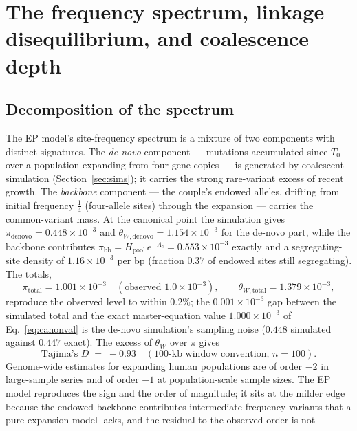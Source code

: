 \section{The frequency spectrum, linkage disequilibrium, and coalescence depth}\label{sec:sfsld}

\subsection{Decomposition of the spectrum}
The EP model's site-frequency spectrum is a mixture of two components with
distinct signatures. The \emph{de-novo} component --- mutations accumulated
since $T_0$ over a population expanding from four gene copies --- is
generated by coalescent simulation (Section~\ref{sec:sims}); it carries the
strong rare-variant excess of recent growth. The \emph{backbone} component
--- the couple's endowed alleles, drifting from initial frequency
$\tfrac14$ (four-allele sites) through the expansion --- carries the
common-variant mass. At the canonical point the simulation gives
$\pi_{\mathrm{denovo}} = 0.448\times10^{-3}$ and
$\theta_{W,\mathrm{denovo}} = 1.154\times10^{-3}$ for the de-novo part,
while the backbone contributes
$\pi_{\mathrm{bb}} = H_{\mathrm{pool}}\,e^{-\Lambda_c} =
0.553\times10^{-3}$ exactly and a segregating-site density of
$1.16\times10^{-3}$ per bp (fraction $0.37$ of endowed sites still
segregating). The totals,
\begin{equation}\label{eq:sfstot}
\pi_{\mathrm{total}} = 1.001\times10^{-3}
\quad (\text{observed } 1.0\times10^{-3}), \qquad
\theta_{W,\mathrm{total}} = 1.379\times10^{-3},
\end{equation}
reproduce the observed level to within $0.2\%$; the $0.001\times10^{-3}$
gap between the simulated total and the exact master-equation value
$1.000\times10^{-3}$ of Eq.~\eqref{eq:canonval} is the de-novo
simulation's sampling noise ($0.448$ simulated against $0.447$ exact).
The excess of $\theta_W$ over $\pi$ gives
\begin{equation}\label{eq:Dval}
\text{Tajima's } D \;=\; -0.93 \quad (100\text{-kb window convention, } n = 100).
\end{equation}
Genome-wide estimates for expanding human populations are of order
$-2$ in large-sample series \citep{Tennessen2012} and of order $-1$ at
population-scale sample sizes. The EP model reproduces the sign and the
order of magnitude; it sits at the milder edge because the endowed
backbone contributes intermediate-frequency variants that a
pure-expansion model lacks, and the residual to the observed order is not
